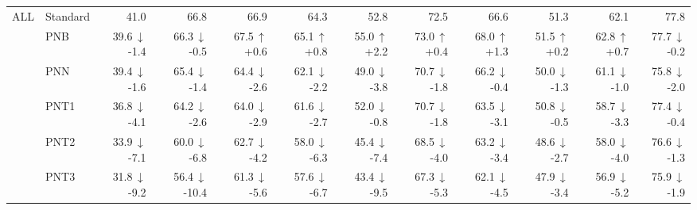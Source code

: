 \begin{table}[t]
{\begin{tabular}{llrrrrrrrrrr}
\midrule
ALL & Standard & {\footnotesize 41.0} & {\footnotesize 66.8} & {\footnotesize 66.9} & {\footnotesize 64.3} & {\footnotesize 52.8} & {\footnotesize 72.5} & {\footnotesize 66.6} & {\footnotesize 51.3} & {\footnotesize 62.1} & {\footnotesize 77.8} \\
 & PNB & {\footnotesize 39.6}{\tiny\,$\downarrow$-1.4} & {\footnotesize 66.3}{\tiny\,$\downarrow$-0.5} & {\footnotesize 67.5}{\tiny\,$\uparrow$+0.6} & {\footnotesize 65.1}{\tiny\,$\uparrow$+0.8} & {\footnotesize 55.0}{\tiny\,$\uparrow$+2.2} & {\footnotesize 73.0}{\tiny\,$\uparrow$+0.4} & {\footnotesize 68.0}{\tiny\,$\uparrow$+1.3} & {\footnotesize 51.5}{\tiny\,$\uparrow$+0.2} & {\footnotesize 62.8}{\tiny\,$\uparrow$+0.7} & {\footnotesize 77.7}{\tiny\,$\downarrow$-0.2} \\
 & PNN & {\footnotesize 39.4}{\tiny\,$\downarrow$-1.6} & {\footnotesize 65.4}{\tiny\,$\downarrow$-1.4} & {\footnotesize 64.4}{\tiny\,$\downarrow$-2.6} & {\footnotesize 62.1}{\tiny\,$\downarrow$-2.2} & {\footnotesize 49.0}{\tiny\,$\downarrow$-3.8} & {\footnotesize 70.7}{\tiny\,$\downarrow$-1.8} & {\footnotesize 66.2}{\tiny\,$\downarrow$-0.4} & {\footnotesize 50.0}{\tiny\,$\downarrow$-1.3} & {\footnotesize 61.1}{\tiny\,$\downarrow$-1.0} & {\footnotesize 75.8}{\tiny\,$\downarrow$-2.0} \\
 & PNT1 & {\footnotesize 36.8}{\tiny\,$\downarrow$-4.1} & {\footnotesize 64.2}{\tiny\,$\downarrow$-2.6} & {\footnotesize 64.0}{\tiny\,$\downarrow$-2.9} & {\footnotesize 61.6}{\tiny\,$\downarrow$-2.7} & {\footnotesize 52.0}{\tiny\,$\downarrow$-0.8} & {\footnotesize 70.7}{\tiny\,$\downarrow$-1.8} & {\footnotesize 63.5}{\tiny\,$\downarrow$-3.1} & {\footnotesize 50.8}{\tiny\,$\downarrow$-0.5} & {\footnotesize 58.7}{\tiny\,$\downarrow$-3.3} & {\footnotesize 77.4}{\tiny\,$\downarrow$-0.4} \\
 & PNT2 & {\footnotesize 33.9}{\tiny\,$\downarrow$-7.1} & {\footnotesize 60.0}{\tiny\,$\downarrow$-6.8} & {\footnotesize 62.7}{\tiny\,$\downarrow$-4.2} & {\footnotesize 58.0}{\tiny\,$\downarrow$-6.3} & {\footnotesize 45.4}{\tiny\,$\downarrow$-7.4} & {\footnotesize 68.5}{\tiny\,$\downarrow$-4.0} & {\footnotesize 63.2}{\tiny\,$\downarrow$-3.4} & {\footnotesize 48.6}{\tiny\,$\downarrow$-2.7} & {\footnotesize 58.0}{\tiny\,$\downarrow$-4.0} & {\footnotesize 76.6}{\tiny\,$\downarrow$-1.3} \\
 & PNT3 & {\footnotesize 31.8}{\tiny\,$\downarrow$-9.2} & {\footnotesize 56.4}{\tiny\,$\downarrow$-10.4} & {\footnotesize 61.3}{\tiny\,$\downarrow$-5.6} & {\footnotesize 57.6}{\tiny\,$\downarrow$-6.7} & {\footnotesize 43.4}{\tiny\,$\downarrow$-9.5} & {\footnotesize 67.3}{\tiny\,$\downarrow$-5.3} & {\footnotesize 62.1}{\tiny\,$\downarrow$-4.5} & {\footnotesize 47.9}{\tiny\,$\downarrow$-3.4} & {\footnotesize 56.9}{\tiny\,$\downarrow$-5.2} & {\footnotesize 75.9}{\tiny\,$\downarrow$-1.9} \\

\end{tabular}}
\end{table}
